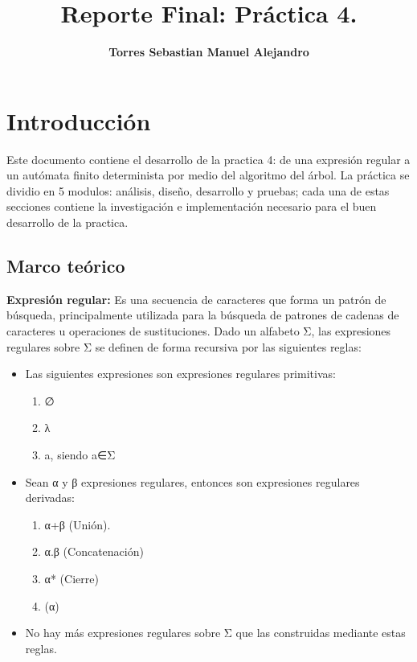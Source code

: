 \documentclass{book}
\title{Reporte Final: Práctica 4.}
\author{\bf Torres Sebastian Manuel Alejandro}
\begin{document}
\maketitle

\chapter{Introducción}

Este documento contiene el desarrollo de la practica 4: de una expresión regular a un autómata finito determinista por medio del algoritmo del árbol. La práctica se dividio en 5 modulos: análisis, diseño, desarrollo y pruebas; cada una de estas secciones contiene la investigación e implementación necesario para el buen desarrollo de la practica.

\section{Marco teórico}

{\bf Expresión regular:} Es una secuencia de caracteres que forma un patrón de búsqueda, principalmente utilizada para la búsqueda de patrones de cadenas de caracteres u operaciones de sustituciones. Dado un alfabeto Σ, las expresiones regulares sobre Σ se definen de forma recursiva por las siguientes reglas:

\begin{itemize}
	\item Las siguientes expresiones son expresiones regulares primitivas:
\begin{enumerate}
		\item ∅
		\item λ
		\item a, siendo a∈Σ
\end{enumerate} 

	\item Sean α y β expresiones regulares, entonces son expresiones
regulares derivadas:
\begin{enumerate}
		\item α+β (Unión).
		\item α.β (Concatenación)
		\item α* (Cierre)
		\item (α)
\end{enumerate}

	\item No hay más expresiones regulares sobre Σ que las construidas mediante estas reglas.
\end{itemize}
\end{document}
